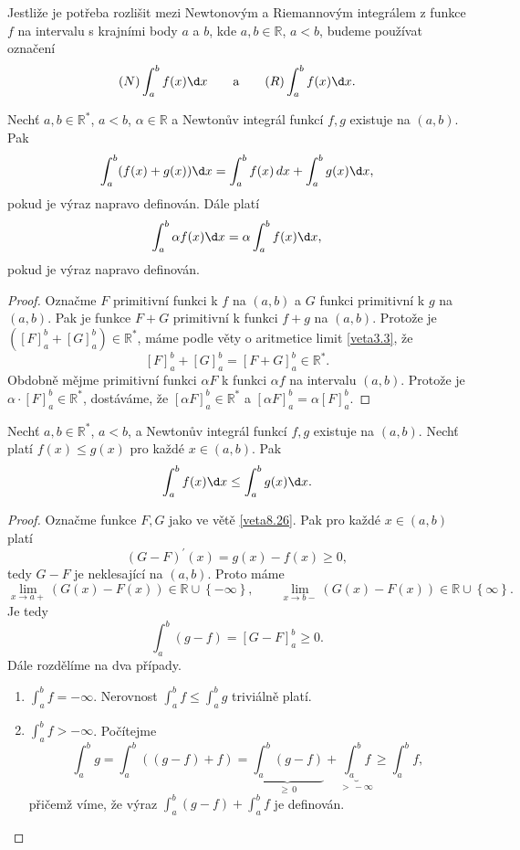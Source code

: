 \begin{oznaceni}
Jestliže je potřeba rozlišit mezi Newtonovým a Riemannovým integrálem z funkce $f$ na intervalu s krajními body $a$ a $b$, kde $a, b \in \mathbb{R}$, $a < b$, budeme používat označení
\[
(N)\int_a^b f(x)\d x \qquad \text{a} \qquad (R)\int_a^b f(x)\d x.
\]
\end{oznaceni}

\begin{veta}\label{veta8.26}
Nechť $a, b \in \mathbb{R}^*$, $a < b$, $\alpha \in \mathbb{R}$ a Newtonův integrál funkcí $f, g$ existuje na $(a, b)$. Pak
\[
\int_a^b (f(x) + g(x))\d x = \int_a^b f(x)\,dx + \int_a^b g(x)\d x,
\]
pokud je výraz napravo definován. Dále platí
\[
\int_a^b \alpha f(x)\d x = \alpha \int_a^b f(x)\d x,
\]
pokud je výraz napravo definován.
\end{veta}

\begin{proof}
	Označme $F$ primitivní funkci k $f$ na $(a,b)$ a $G$
	funkci primitivní k $g$ na $(a,b)$. Pak je funkce $F+G$
	primitivní k funkci $f+g$ na $(a,b)$. Protože je
	$\left( [F]_a^b + [G]_a^b \right )\in \mathbb R ^* $,
	máme podle věty o
	aritmetice limit \ref{veta3.3}, že
$$
[F]_a^b+[G]_a^b=\left [ F+G \right ]_a^b \in \mathbb R ^* .
$$
Obdobně mějme primitivní funkci $\alpha F$ k funkci $\alpha f$
na intervalu $(a,b)$. Protože je $\alpha \cdot [F]_a^b\in\mathbb R
^*$,
dostáváme, že $[\alpha F]_a^b \in \mathbb R^*$ a $[\alpha F]_a^b=\alpha [F]_a^b$.
\end{proof}

\begin{veta}\label{veta8.27}
Nechť $a, b \in \mathbb{R}^*$, $a < b$, a Newtonův integrál funkcí $f, g$ existuje na $(a, b)$. Nechť platí $f(x) \leq g(x)$ pro každé $x \in (a, b)$. Pak
\[
\int_a^b f(x)\d x \leq \int_a^b g(x)\d x.
\]
\end{veta}

\begin{proof}
	Označme funkce $F,G$ jako ve větě \ref{veta8.26}.
	Pak pro každé $x \in (a,b)$ platí
	$$
	    (G-F)^\prime(x) = g(x) - f(x) \geq 0,
	$$
	tedy $G-F$ je neklesající na $(a,b)$. Proto máme
	$$
 \lim_{x\to a+} (G(x)-F(x)) \in \mathbb R \cup \left \{ -\infty \right \}, \qquad \lim_{x\to b-} (G(x)-F(x))\in \mathbb R \cup \left \{ \infty \right \}.
	$$
	Je tedy
	$$
	    \int_a^b (g-f) = [G-F]_a^b \geq 0.
	$$
	Dále rozdělíme na dva případy.
	\begin{enumerate}[(1)]
		\item $\int_a^b f = -\infty$. Nerovnost $\int_a^b f \leq \int_a^b g$ triviálně platí.
		\item $\int_a^b f > -\infty$. Počítejme
		$$
		    \int_a^b g = \int_a^b \left( (g-f)+f \right ) = \underbrace{\int_a^b(g-f)}_{\geq \, 0}+\underbrace{\int_a^b f}_{> \, -\infty}\geq \int_a^b f,
		$$
		přičemž víme, že výraz $\int_a^b(g-f)+\int_a^b f$ je definován.\qedhere
\end{enumerate}
\end{proof}

